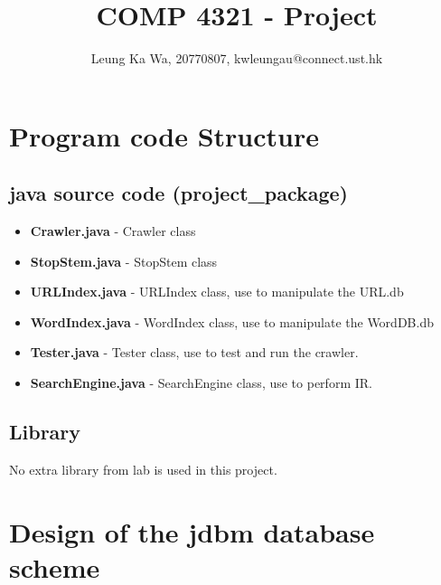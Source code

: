 \documentclass{article}
\title{COMP 4321 - Project}
\author{Leung Ka Wa, 20770807, kwleungau@connect.ust.hk}
\date{}
\begin{document}
    \maketitle
    \section*{Program code Structure}
        \subsection*{java source code (project\_package)}
            \begin{itemize}
                \item \textbf{Crawler.java} - Crawler class
                \item \textbf{StopStem.java} - StopStem class
                \item \textbf{URLIndex.java} - URLIndex class, use to manipulate the URL.db
                \item \textbf{WordIndex.java} - WordIndex class, use to manipulate the WordDB.db
                \item \textbf{Tester.java} - Tester class, use to test and run the crawler.
                \item \textbf{SearchEngine.java} - SearchEngine class, use to perform IR.
            \end{itemize}
        \subsection*{Library}
            No extra library from lab is used in this project.

    \section*{Design of the jdbm database scheme}
\end{document}
